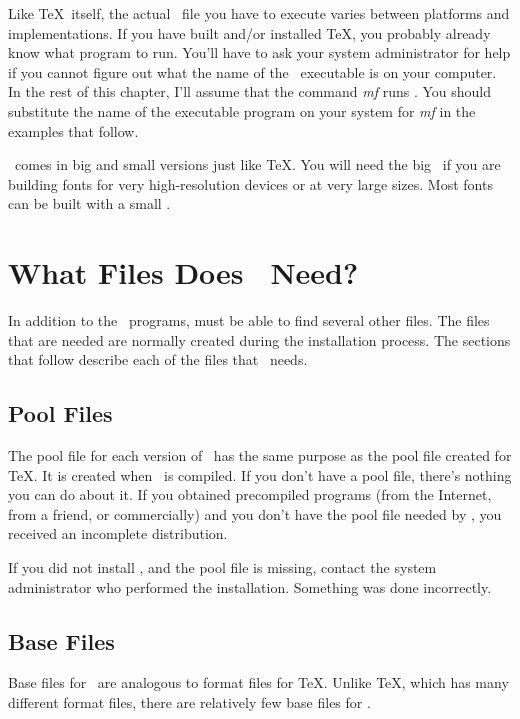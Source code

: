 Like \TeX\ itself, the actual \MF\ file you have to execute
 varies between
platforms and implementations.  If you have built and/or installed
\TeX, you probably already know what program to run.  
You'll have to ask your system administrator for help if you cannot
figure out what the name of the \MF\ executable is on your computer.
In the rest
\linebreak
\newpage
of this chapter, I'll assume that the command \textit{mf}
runs \MF.  You should substitute the name of the executable
program on your system for \textit{mf} in the examples that follow.

\MF\ comes in big and small versions just like \TeX.  You will
need the big \MF\ if you are building fonts for very high-resolution
devices or at very large sizes.  Most fonts can be built with a small
\MF.

\section{What Files Does \protect\MF\ Need?}

In addition to the \MF\ programs, \MF{} must 
be able to find several
other files.  The files that are needed are normally created during the
installation process.  The sections that follow describe each of the
files that \MF\ needs.

\subsection{Pool Files}

The pool file for each 
version of \MF\ has the same purpose as the
pool file created for \TeX.  It is created when \MF\ is compiled.
If you don't have a pool file, there's nothing you can do about it.
If you obtained precompiled programs (from the Internet, from a
friend, or commercially) and you don't have the pool file needed by
\MF, you received an incomplete distribution.

If you did not install \MF, and the pool file is missing, contact the
system administrator who performed the installation.  Something was
done incorrectly.

\subsection{Base Files}

Base files for \MF\ are 
analogous to format files for \TeX.
Unlike \TeX, which has many different format files, there are
relatively few base files for \MF.  

